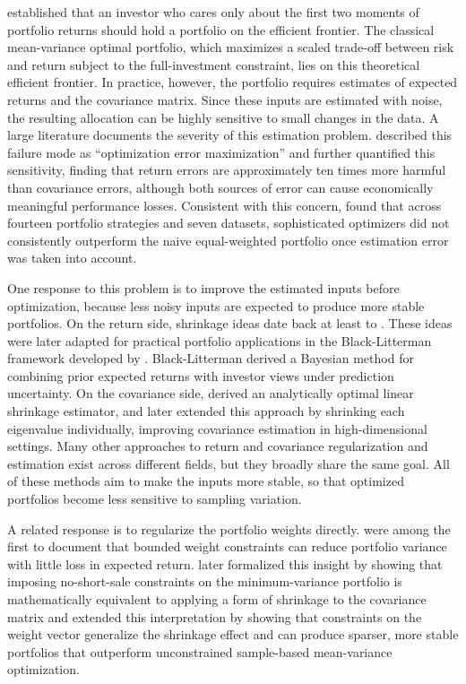 \documentclass[12pt]{article}
\begin{document}
\citet{markowitz1952} established that an investor who cares only about the first two moments of portfolio returns should hold a portfolio on the efficient frontier. The classical mean-variance optimal portfolio, which maximizes a scaled trade-off between risk and return subject to the full-investment constraint, lies on this theoretical efficient frontier. In practice, however, the portfolio requires estimates of expected returns and the covariance matrix. Since these inputs are estimated with noise, the resulting allocation can be highly sensitive to small changes in the data. A large literature documents the severity of this estimation problem. \citet{michaud1989} described this failure mode as ``optimization error maximization'' and \citet{chopraziemba1993} further quantified this sensitivity, finding that return errors are approximately ten times more harmful than covariance errors, although both sources of error can cause economically meaningful performance losses. Consistent with this concern, \citet{demiguel2009} found that across fourteen portfolio strategies and seven datasets, sophisticated optimizers did not consistently outperform the naive equal-weighted portfolio once estimation error was taken into account.

One response to this problem is to improve the estimated inputs before optimization, because less noisy inputs are expected to produce more stable portfolios. On the return side, shrinkage ideas date back at least to \citet{stein1956}. These ideas were later adapted for practical portfolio applications in the Black-Litterman framework developed by \citet{blacklitterman1992}. Black-Litterman derived a Bayesian method for combining prior expected returns with investor views under prediction uncertainty. On the covariance side, \citet{ledoitwolf2004} derived an analytically optimal linear shrinkage estimator, and \citet{ledoitwolf2020} later extended this approach by shrinking each eigenvalue individually, improving covariance estimation in high-dimensional settings. Many other approaches to return and covariance regularization and estimation exist across different fields, but they broadly share the same goal. All of these methods aim to make the inputs more stable, so that optimized portfolios become less sensitive to sampling variation.

A related response is to regularize the portfolio weights directly. \citet{frostsavarino1988} were among the first to document that bounded weight constraints can reduce portfolio variance with little loss in expected return. \citet{jagannathanma2003} later formalized this insight by showing that imposing no-short-sale constraints on the minimum-variance portfolio is mathematically equivalent to applying a form of shrinkage to the covariance matrix and \citet{demiguelnogales2009} extended this interpretation by showing that constraints on the weight vector generalize the shrinkage effect and can produce sparser, more stable portfolios that outperform unconstrained sample-based mean-variance optimization.
\end{document}
